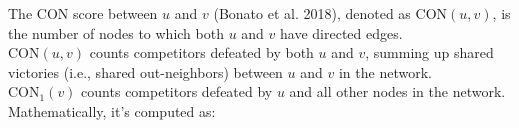 \documentclass[preview]{standalone}
\begin{document}
The CON score between $u$ and $v$ (Bonato et al. 2018), denoted as $\text{CON}(u, v)$, is the number of nodes to which both $u$ and $v$ have directed edges.\\$\text{CON}(u, v)$ counts competitors defeated by both $u$ and $v$, summing up shared victories (i.e., shared out-neighbors) between $u$ and $v$ in the network.\\$\text{CON}_{1}(v)$ counts competitors defeated by $u$ and all other nodes in the network.\\Mathematically, it's computed as:\\
\end{document}
